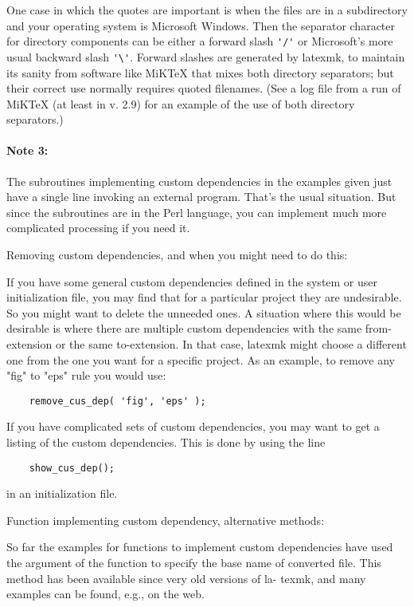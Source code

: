 One  case in which the quotes are important is when the files
are in a subdirectory and your operating system is  Microsoft  Windows.
Then  the  separator character for directory components can be either a forward
slash \verb|'/'| or Microsoft's more usual backward slash  \verb|'\'|.   Forward
slashes  are  generated  by  latexmk, to maintain its sanity from software like
MiKTeX that mixes both directory  separators;  but  their correct use normally
requires quoted filenames.  (See a log file from a run of MiKTeX (at least in
v. 2.9) for an example of the  use  of  both directory separators.)

\paragraph{Note  3:}

The subroutines implementing custom dependencies in the examples given just
have  a  single  line  invoking  an  external  program.  That's  the usual
situation.  But since the subroutines are in the Perl language, you can
implement much more  complicated  processing  if  you need it.


Removing custom dependencies, and when you might need to do this:

If  you  have some general custom dependencies defined in the system or user
initialization file, you may find that for  a  particular  project they  are
undesirable.  So you might want to delete the unneeded ones.  A situation where
this would be desirable is where there  are  multiple custom  dependencies with
the same from-extension or the same to-extension. In that case, latexmk might
choose a different one from  the  one you want for a specific project.  As an
example, to remove any "fig" to "eps" rule you would use:

\begin{verbatim}
	remove_cus_dep( 'fig', 'eps' );
\end{verbatim}

If you have complicated sets of custom dependencies, you  may  want  to
get  a  listing  of the custom dependencies.  This is done by using the
line

\begin{verbatim}
	show_cus_dep();
\end{verbatim}

in an initialization file.


Function implementing custom dependency, alternative methods:

So far the examples for functions to implement custom dependencies have
used the argument of the function to specify the base name of converted
file.  This method has been available since very old  versions  of  la-
texmk, and many examples can be found, e.g., on the web.

